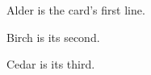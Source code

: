 \documentclass[preset=card]{ltface}
\begin{document}
\begin{frame}
Alder is the card's first line.

Birch is its second.

Cedar is its third.
\end{frame}
\end{document}
